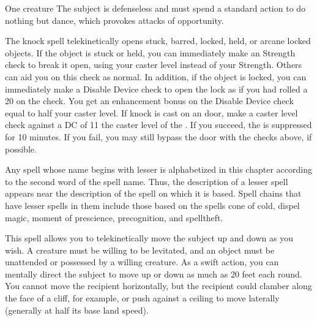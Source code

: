 \spellrng{\rngclose}
\begin{spelltarget}{One creature}
    \spelleffect The subject is defenseless and must spend a standard action to do nothing but dance, which provokes attacks of opportunity.
\end{spelltarget}

\begin{comment}
\subsubsection{J-L}
\end{comment}

\spelleffect The knock spell telekinetically opens stuck, barred, locked, held, or arcane locked objects. If the object is stuck or held, you can immediately make an Strength check to break it open, using your caster level instead of your Strength. Others can aid you on this check as normal. In addition, if the object is locked, you can immediately make a Disable Device check to open the lock as if you had rolled a 20 on the check. You get an enhancement bonus on the Disable Device check equal to half your caster level.
\spellnotes If knock is cast on an  door, make a caster level check against a DC of 11 \add the caster level of the . If you succeed, the  is suppressed for 10 minutes. If you fail, you may still bypass the door with the checks above, if possible.

\par Any spell whose name begins with lesser is alphabetized in this chapter according to the second word of the spell name. Thus, the description of a lesser spell appears near the description of the spell on which it is based. Spell chains that have lesser spells in them include those based on the spells cone of cold, dispel magic, moment of prescience, precognition, and spelltheft.

\spelldur{\durshort \dismissable}
\spelleffect This spell allows you to telekinetically move the subject up and down as you wish. A creature must be willing to be levitated, and an object must be unattended or possessed by a willing creature. As a swift action, you can mentally direct the subject to move up or down as much as 20 feet each round. You cannot move the recipient horizontally, but the recipient could clamber along the face of a cliff, for example, or push against a ceiling to move laterally (generally at half its base land speed).

